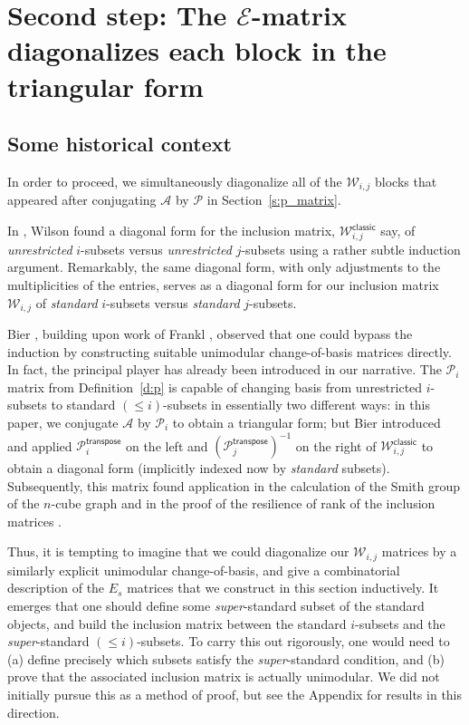 \documentclass[11pt]{article}
\theoremstyle{definition}
\numberwithin{equation}{section}
\numberwithin{equation}{section}
\renewcommand{\P}{\mathcal{P}}
\newcommand{\E}{\mathcal{E}}
\newcommand{\W}{\mathcal{W}}
\newcommand{\A}{\mathcal{A}}
\begin{document}
\section{Second step:  The \texorpdfstring{$\E$}{E}-matrix diagonalizes each block in the triangular form}\label{s:e_matrix}

\subsection{Some historical context}

In order to proceed, we simultaneously diagonalize all of the $\W_{i,j}$ blocks that appeared after conjugating $\A$ by $\P$ in Section~\ref{s:p_matrix}. 

In \cite{wilson_classic}, Wilson found a diagonal form for the inclusion matrix, $\W^{\mathsf{classic}}_{i,j}$ say, of {\em unrestricted} $i$-subsets versus {\em unrestricted} $j$-subsets using a rather subtle induction argument.  Remarkably, the same diagonal form, with only adjustments to the multiplicities of the entries, serves as a diagonal form for our inclusion matrix $\W_{i,j}$ of {\em standard} $i$-subsets versus {\em standard} $j$-subsets.

Bier \cite{bier}, building upon work of Frankl \cite{frankl}, observed that one could bypass the induction by constructing suitable unimodular change-of-basis matrices directly.  In fact, the principal player has already been introduced in our narrative.  The $\P_i$ matrix from Definition~\ref{d:p} is capable of changing basis from unrestricted $i$-subsets to standard $(\leq i)$-subsets in essentially two different ways:  in this paper, we conjugate $\A$ by $\P_i$ to obtain a triangular form; but Bier introduced and applied $\P_i^{\mathsf{transpose}}$ on the left and $\left(\P_j^{\mathsf{transpose}}\right)^{-1}$ on the right of $\W^{\mathsf{classic}}_{i,j}$ to obtain a diagonal form (implicitly indexed now by {\em standard} subsets).  Subsequently, this matrix found application in the calculation of the Smith group of the $n$-cube graph \cite{hypercube} and in the proof of the resilience of rank of the inclusion matrices \cite{resilience}.

Thus, it is tempting to imagine that we could diagonalize our $\W_{i,j}$ matrices by a similarly explicit unimodular change-of-basis, and give a combinatorial description of the $E_s$ matrices that we construct in this section inductively.  It emerges that one should define some {\em super}-standard subset of the standard objects, and build the inclusion matrix between the standard $i$-subsets and the {\em super}-standard $(\leq i)$-subsets.  To carry this out rigorously, one would need to (a) define precisely which subsets satisfy the {\em super}-standard condition, and (b) prove that the associated inclusion matrix is actually unimodular.  We did not initially pursue this as a method of proof, but see the Appendix for results in this direction.
\end{document}
